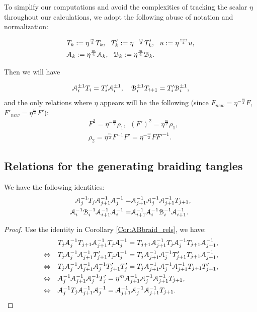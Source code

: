 \documentclass{amsart}
\begin{document}
 
\begin{defn}
To simplify our computations and avoid the complexities of tracking the scalar $\eta$ throughout our calculations, we adopt the following abuse of notation and normalization:

\begin{align*}
 &T_k:=\eta^{\frac{m}{2}} T_k,\ \ T_k':=\eta^{-\frac{m}{2}} T'_k,\ \ u:=\eta^{\frac{mn}{4}}u,\\
 &\AA_{k}:=\eta^{\frac{m}{4}}\AA_{k},\ \ \BB_{k}:=\eta^{\frac{m}{4}}\BB_{k}.
\end{align*}    
\end{defn}

Then we will have

\[
\AA^{\pm1}_iT_i=T_i'\AA_i^{\pm1},\quad \BB^{\pm1}_iT_{i+1}=T_i'\BB_i^{\pm1},
\]
and the only relations where $\eta$ appears will be the following (since $F_{new}=\eta^{-\frac{m}{4}}F$, $F'_{new}=\eta^{\frac{m}{4}}F'$):
\begin{align*}
 &F^2=\eta^{-\frac{m}{2}}\rho_1,\ \ (F')^2=\eta^{\frac{m}{2}}\rho_1, \\
 &\rho_2=\eta^{\frac{m}{2}}F^{-1}F'=\eta^{-\frac{m}{2}}FF'^{-1}.
\end{align*}

\subsection{Relations for the generating braiding tangles}

\begin{lem}\label{lem:Abraid_rels}
We have the following identities:
\begin{align*}
\AA^{-1}_jT_{j}\AA^{-1}_{j+1}\AA^{-1}_{j}=&\AA^{-1}_{j+1}\AA^{-1}_{j}\AA^{-1}_{j+1}T_{j+1},\\
\AA^{-1}_i\BB^{-1}_i\AA^{-1}_{i+1}\AA^{-1}_i=&\AA^{-1}_{i+1}\AA^{-1}_{i}\BB^{-1}_i\AA^{-1}_{i+1}.
\end{align*}
\end{lem}
\begin{proof}
Use the identity in Corollary \ref{Cor:ABbraid_rels}, we have: 
\begin{align*}
&T_j\AA^{-1}_jT_{j+1}\AA^{-1}_{j+1}T_j\AA^{-1}_{j}=T_{j+1}\AA^{-1}_{j+1}T_{j}\AA^{-1}_{j}T_{j+1}\AA^{-1}_{j+1},\\
\Leftrightarrow \quad&T_j\AA^{-1}_j\AA^{-1}_{j+1}T'_{j+1}T_j\AA^{-1}_{j}=T_{j}\AA^{-1}_{j+1}\AA^{-1}_{j}T'_{j+1}T_{j+1}\AA^{-1}_{j+1},\\
\Leftrightarrow
\quad&T_j\AA^{-1}_j\AA^{-1}_{j+1}\AA^{-1}_{j}T'_{j+1}T'_j=T_{j}\AA^{-1}_{j+1}\AA^{-1}_{j}\AA^{-1}_{j+1}T_{j+1}T'_{j+1},\\
\Leftrightarrow
\quad&\AA^{-1}_j\AA^{-1}_{j+1}\AA^{-1}_{j}T'_j=\eta^{m}\AA^{-1}_{j+1}\AA^{-1}_{j}\AA^{-1}_{j+1}T_{j+1},\\
\Leftrightarrow
\quad&\AA^{-1}_jT_{j}\AA^{-1}_{j+1}\AA^{-1}_{j}=\AA^{-1}_{j+1}\AA^{-1}_{j}\AA^{-1}_{j+1}T_{j+1}.
\end{align*}   
\end{proof}
\end{document}
